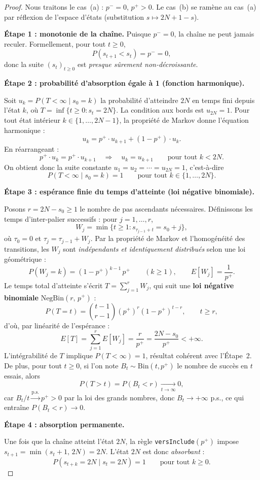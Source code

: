 \documentclass[12pt,a4paper]{article}
\theoremstyle{remark}
\begin{document}
\begin{proof}
Nous traitons le cas~(a) : $p^- = 0$, $p^+ > 0$.
Le cas~(b) se ramène au cas~(a) par réflexion de l'espace d'états (substitution $s \mapsto 2N+1-s$).

\medskip
\textbf{Étape 1 : monotonie de la chaîne.}
Puisque $p^- = 0$, la chaîne ne peut jamais reculer. Formellement, pour tout $t \ge 0$,
\[
  P(s_{t+1} < s_t) = p^- = 0,
\]
donc la suite $(s_t)_{t \ge 0}$ est \emph{presque sûrement non-décroissante}.

\medskip
\textbf{Étape 2 : probabilité d'absorption égale à 1 (fonction harmonique).}

Soit $u_k = P(T < \infty \mid s_0 = k)$ la probabilité d'atteindre $2N$ en temps fini
depuis l'état $k$, où $T = \inf\{t \ge 0 : s_t = 2N\}$.
La condition aux bords est $u_{2N} = 1$.
Pour tout état intérieur $k \in \{1,\ldots,2N-1\}$, la propriété de Markov donne
l'équation harmonique :
\[
  u_k = p^+ \cdot u_{k+1} + (1-p^+) \cdot u_k.
\]
En réarrangeant :
\[
  p^+ \cdot u_k = p^+ \cdot u_{k+1} \quad \Longrightarrow \quad u_k = u_{k+1}
  \qquad \text{pour tout } k < 2N.
\]
On obtient donc la suite constante $u_1 = u_2 = \cdots = u_{2N} = 1$, c'est-à-dire
\[
  \boxed{P(T < \infty \mid s_0 = k) = 1 \qquad \text{pour tout } k \in \{1,\ldots,2N\}.}
\]

\medskip
\textbf{Étape 3 : espérance finie du temps d'atteinte (loi négative binomiale).}

Posons $r = 2N - s_0 \ge 1$ le nombre de pas ascendants nécessaires.
Définissons les temps d'inter-palier successifs : pour $j = 1, \ldots, r$,
\[
  W_j = \min\bigl\{t \ge 1 : s_{\tau_{j-1}+t} = s_0 + j\bigr\},
\]
où $\tau_0 = 0$ et $\tau_j = \tau_{j-1} + W_j$.
Par la propriété de Markov et l'homogénéité des transitions, les $W_j$ sont
\emph{indépendants et identiquement distribués} selon une loi géométrique :
\[
  P(W_j = k) = (1-p^+)^{k-1}\, p^+ \qquad (k \ge 1),
  \qquad
  E[W_j] = \frac{1}{p^+}.
\]
Le temps total d'atteinte s'écrit $T = \sum_{j=1}^{r} W_j$, qui suit une
\textbf{loi négative binomiale} $\mathrm{NegBin}(r,\, p^+)$ :
\[
  P(T = t) = \binom{t-1}{r-1} (p^+)^r (1-p^+)^{t-r}, \qquad t \ge r,
\]
d'où, par linéarité de l'espérance :
\[
  \boxed{E[T] = \sum_{j=1}^{r} E[W_j] = \frac{r}{p^+} = \frac{2N - s_0}{p^+} < +\infty.}
\]
L'intégrabilité de $T$ implique $P(T < \infty) = 1$, résultat cohérent avec l'Étape~2.
De plus, pour tout $t \ge 0$, si l'on note $B_t \sim \mathrm{Bin}(t, p^+)$ le nombre de
succès en $t$ essais, alors
\[
  P(T > t) = P(B_t < r) \xrightarrow[t \to \infty]{} 0,
\]
car $B_t / t \xrightarrow{\text{p.s.}} p^+ > 0$ par la loi des grands nombres, donc
$B_t \to +\infty$ p.s., ce qui entraîne $P(B_t < r) \to 0$.

\medskip
\textbf{Étape 4 : absorption permanente.}

Une fois que la chaîne atteint l'état $2N$, la règle \texttt{versInclude}$(p^+)$ impose
$s_{t+1} = \min(s_t + 1,\, 2N) = 2N$. L'état $2N$ est donc \emph{absorbant} :
\[
  P(s_{t+k} = 2N \mid s_t = 2N) = 1 \qquad \text{pour tout } k \ge 0.
\]
\end{proof}
\end{document}
